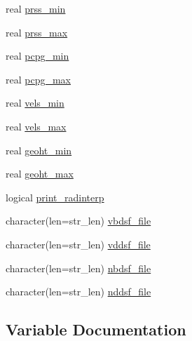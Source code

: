\begin{DoxyCompactItemize}
\item 
real \hyperlink{namespacemet__driver__coms_a2ce8ae5dcf47b145fe6e4e73111f583a}{prss\+\_\+min}
\item 
real \hyperlink{namespacemet__driver__coms_ad1eb689e5f4208a3cb8c1565220b7f2f}{prss\+\_\+max}
\item 
real \hyperlink{namespacemet__driver__coms_ad1841d1a071652e80742e648d0eed3e8}{pcpg\+\_\+min}
\item 
real \hyperlink{namespacemet__driver__coms_adb27c5034caa99a0fcc4d3b42ef1d2e3}{pcpg\+\_\+max}
\item 
real \hyperlink{namespacemet__driver__coms_ac3d38fa5850b9e27104cf9949d2b5c15}{vels\+\_\+min}
\item 
real \hyperlink{namespacemet__driver__coms_a95bff007e6bff6167b2a89758d76fc2e}{vels\+\_\+max}
\item 
real \hyperlink{namespacemet__driver__coms_a2662a56fa4062bd473b19c649fa43b95}{geoht\+\_\+min}
\item 
real \hyperlink{namespacemet__driver__coms_aa1669f7b7ef87420b77b82855f067517}{geoht\+\_\+max}
\item 
logical \hyperlink{namespacemet__driver__coms_a12635d011e458fe5603d8af326faa956}{print\+\_\+radinterp}
\item 
character(len=str\+\_\+len) \hyperlink{namespacemet__driver__coms_a5077cb97033c5b4e610edbe044ce890e}{vbdsf\+\_\+file}
\item 
character(len=str\+\_\+len) \hyperlink{namespacemet__driver__coms_aeb25a3a4ea0b2fd649a7bab6b694d8be}{vddsf\+\_\+file}
\item 
character(len=str\+\_\+len) \hyperlink{namespacemet__driver__coms_a8f3d2674e75157c654a61aa253ba5ac7}{nbdsf\+\_\+file}
\item 
character(len=str\+\_\+len) \hyperlink{namespacemet__driver__coms_a8adb3cddd748a6ba29fb75dd69ca54c7}{nddsf\+\_\+file}
\end{DoxyCompactItemize}


\subsection{Variable Documentation}
\mbox{\label{namespacemet__driver__coms_aec2e25a82647949db4d9bbaafb62220c}} 
